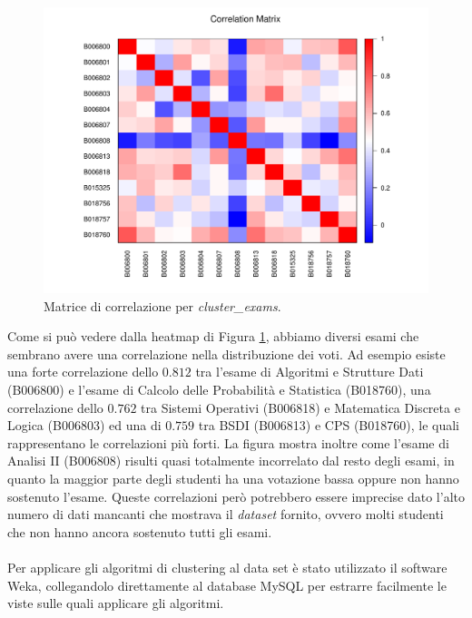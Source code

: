 \documentclass[]{article}
\begin{document}
\begin{figure}[h]
	\centering
	\includegraphics[scale=0.5]{Img/corr_matrix_exams.pdf}
	\caption{Matrice di correlazione per \textit{cluster\_exams}.
		\label{fig:2}}
\end{figure} 

Come si pu\`{o} vedere dalla heatmap di Figura \ref{fig:2}, abbiamo diversi esami che sembrano avere una correlazione nella distribuzione dei voti. Ad esempio esiste una forte correlazione dello $0.812$ tra l'esame di Algoritmi e Strutture Dati (B006800) e l'esame di Calcolo delle Probabilit\`{a} e Statistica (B018760), una correlazione dello $0.762$ tra Sistemi Operativi (B006818) e Matematica Discreta e Logica (B006803) ed una di $0.759$ tra BSDI (B006813) e CPS (B018760), le quali rappresentano le correlazioni pi\`{u} forti. La figura mostra inoltre come l'esame di Analisi II (B006808) risulti quasi totalmente incorrelato dal resto degli esami, in quanto la maggior parte degli studenti ha una votazione bassa oppure non hanno sostenuto l'esame. Queste correlazioni per\`{o} potrebbero essere imprecise dato l'alto numero di dati mancanti che mostrava il \textit{dataset} fornito, ovvero molti studenti che non hanno ancora sostenuto tutti gli esami.

\paragraph{}
Per applicare gli algoritmi di clustering al data set \`{e} stato utilizzato il software Weka, collegandolo direttamente al database MySQL per estrarre facilmente le viste sulle quali applicare gli algoritmi.
\end{document}
